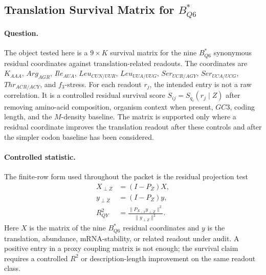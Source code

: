 \subsection{Translation Survival Matrix for $B^{*}_{Q6}$}
\label{sec:bioreality-translation-survival-b-star-q6-survival-matrix}

\paragraph{Question.}
The object tested here is a $9 \times K$ survival matrix for the nine $B^{*}_{Q6}$ synonymous residual coordinates against translation-related readouts. The coordinates are
$K_{AAA}$, $Arg_{AGR}$, $Ile_{AUA}$, $Leu_{CUN/UUR}$, $Leu_{UUA/UUG}$, $Ser_{UCR/AGY}$, $Ser_{UCA/UCG}$, $Thr_{ACR/ACY}$, and $f_3$-stress. For each readout $r_j$, the intended entry is not a raw correlation. It is a controlled residual survival score $S_{ij}=S_{q_i}(r_j\mid Z)$ after removing amino-acid composition, organism context when present, $GC3$, coding length, and the $M$-density baseline. The matrix is supported only where a residual coordinate improves the translation readout after these controls and after the simpler codon baseline has been considered.

\paragraph{Controlled statistic.}
The finite-row form used throughout the packet is the residual projection test
$$
\begin{aligned}
X_{\perp Z} &= (I-P_Z)X,\\
y_{\perp Z} &= (I-P_Z)y,\\
R^2_{QY} &= \frac{\|P_{X_{\perp Z}}y_{\perp Z}\|^2}{\|y_{\perp Z}\|^2}.
\end{aligned}
$$
Here $X$ is the matrix of the nine $B^{*}_{Q6}$ residual coordinates and $y$ is the translation, abundance, mRNA-stability, or related readout under audit. A positive entry in a proxy coupling matrix is not enough; the survival claim requires a controlled $R^2$ or description-length improvement on the same readout class.

